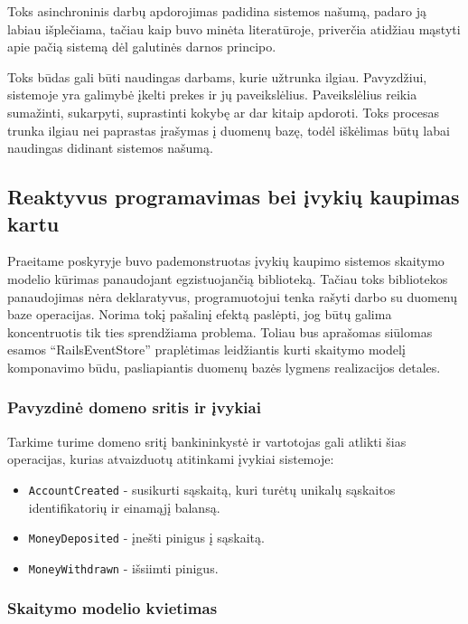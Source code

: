 Toks asinchroninis darbų apdorojimas padidina sistemos našumą, padaro ją labiau išplečiama, tačiau kaip buvo minėta literatūroje, priverčia atidžiau mąstyti apie pačią sistemą dėl galutinės darnos principo.

Toks būdas gali būti naudingas darbams, kurie užtrunka ilgiau. Pavyzdžiui, sistemoje yra galimybė įkelti prekes ir jų paveikslėlius. Paveikslėlius reikia sumažinti, sukarpyti, suprastinti kokybę ar dar kitaip apdoroti. Toks procesas trunka ilgiau nei paprastas įrašymas į duomenų bazę, todėl iškėlimas būtų labai naudingas didinant sistemos našumą.

\subsection{Reaktyvus programavimas bei įvykių kaupimas kartu}

Praeitame poskyryje buvo pademonstruotas įvykių kaupimo sistemos skaitymo modelio kūrimas panaudojant egzistuojančią biblioteką. Tačiau toks bibliotekos panaudojimas nėra deklaratyvus, programuotojui tenka rašyti darbo su duomenų baze operacijas. Norima tokį pašalinį efektą paslėpti, jog būtų galima koncentruotis tik ties sprendžiama problema. Toliau bus aprašomas siūlomas esamos ``RailsEventStore'' praplėtimas leidžiantis kurti skaitymo modelį komponavimo būdu, pasliapiantis duomenų bazės lygmens realizacijos detales.

\subsubsection{Pavyzdinė domeno sritis ir įvykiai}

Tarkime turime domeno sritį bankininkystė ir vartotojas gali atlikti šias operacijas, kurias atvaizduotų atitinkami įvykiai sistemoje:

\begin{itemize}
  \item \lstinline|AccountCreated| - susikurti sąskaitą, kuri turėtų unikalų sąskaitos identifikatorių ir einamąjį balansą.
  \item \lstinline|MoneyDeposited| - įnešti pinigus į sąskaitą.
  \item \lstinline|MoneyWithdrawn| - išsiimti pinigus.
\end{itemize}

\subsubsection{Skaitymo modelio kvietimas}

